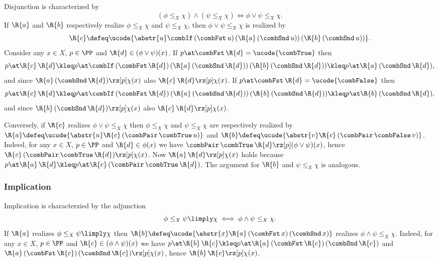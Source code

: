 Disjunction is characterized by
%
\begin{equation*}
  (\phi \leq_X \chi) \land (\psi \leq_X \chi) \iff \phi \lor \psi \leq_X \chi.
\end{equation*}
%
If $\R{a}$ and $\R{b}$ respectively realize $\phi \leq_X \chi$ and $\psi \leq_X \chi$, then $\phi \lor \psi \leq_X \chi$ is realized by
%
\begin{equation*}
  \R{c} \defeq
  \ucode{\abstr{u} \combIf \, (\combFst \, u) \, (\R{a} \, (\combSnd \, u)) \, (\R{b} \, (\combSnd \, u))}.
\end{equation*}
%
Consider any $x \in X$, $p \in \PP$ and $\R{d} \in (\phi \lor \psi)(x)$.
If $p \at \combFst \, \R{d} = \ucode{\combTrue}$ then
%
\begin{equation*}
  p \at \R{c} \, \R{d}
  \kleq
  p \at \combIf \, (\combFst \, \R{d}) \, (\R{a} \, (\combSnd \, \R{d})) \, (\R{b} \, (\combSnd \, \R{d}))
  \kleq
  p \at \R{a} \, (\combSnd \, \R{d}),
\end{equation*}
%
and since $\R{a} \, (\combSnd \, \R{d}) \rz[p] \chi(x)$ also $\R{c} \, \R{d} \rz[p] \chi(x)$.
%
If $p \at \combFst \, \R{d} = \ucode{\combFalse}$ then
%
\begin{equation*}
  p \at \R{c} \, \R{d}
  \kleq
  p \at \combIf \, (\combFst \, \R{d}) \, (\R{a} \, (\combSnd \, \R{d})) \, (\R{b} \, (\combSnd \, \R{d}))
  \kleq
  p \at \R{b} \, (\combSnd \, \R{d}),
\end{equation*}
%
and since $\R{b} \, (\combSnd \, \R{d}) \rz[p] \chi(x)$ also $\R{c} \, \R{d} \rz[p] \chi(x)$.

Conversely, if $\R{c}$ realizes $\phi \lor \psi \leq_X \chi$ then $\phi \leq_X \chi$ and $\psi \leq_X \chi$ are respectively realized by $\R{a} \defeq \ucode{\abstr{u} \R{c} \, (\combPair \, \combTrue \, u)}$ and $\R{b} \defeq \ucode{\abstr{v} \R{c} \, (\combPair \, \combFalse \, v)}$.
%
Indeed, for any $x \in X$, $p \in \PP$ and $\R{d} \in \phi(x)$ we have $\combPair \, \combTrue \, \R{d} \rz[p] (\phi \lor \psi)(x)$, hence $\R{c} \, (\combPair \, \combTrue \, \R{d}) \rz[p] \chi(x)$. Now $\R{a} \, \R{d} \rz[p] \chi(x)$ holds because
$p \at \R{a} \, \R{d} \kleq p \at \R{c} \, (\combPair \, \combTrue \, \R{d})$.
The argument for $\R{b}$ and $\psi \leq_X \chi$ is analogous.

\subsubsection{Implication}
\label{sec:implication}

Implication is characterzied by the adjunction
%
\begin{equation*}
   \phi \leq_X \psi \limply \chi\iff \phi \land \psi \leq_X \chi.
\end{equation*}
%
If $\R{a}$ realizes $\phi \leq_X \psi \limply \chi$ then $\R{b} \defeq \ucode{\abstr{x} \R{a} \, (\combFst \, x) \, (\combSnd \, x)}$ realizes $\phi \land \psi \leq_X \chi$. Indeed, for any $x \in X$, $p \in \PP$ and $\R{c} \in (\phi \land \psi)(x)$ we have
%
$
  p \at \R{b} \, \R{c}
  \kleq
  p \at \R{a} \, (\combFst \, \R{c}) \, (\combSnd \, \R{c})
$
%
and $\R{a} \, (\combFst \, \R{c}) \, (\combSnd \, \R{c}) \rz[p] \chi(x)$, hence $\R{b} \, \R{c} \rz[p] \chi(x)$.

